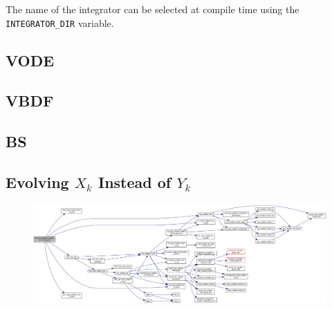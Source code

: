 The name of the integrator can be selected at compile time using
the {\tt INTEGRATOR\_DIR} variable.

\subsection{VODE}
\label{sec:VODE}

\subsection{VBDF}
\label{sec:VBDF}

\subsection{BS}
\label{sec:BS}


\subsection{Evolving $X_k$ Instead of $Y_k$}

\begin{figure}
\centering
\includegraphics[width=\linewidth]{doxygen_network}
\end{figure}
